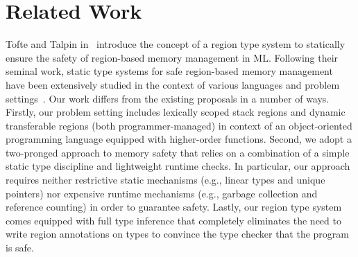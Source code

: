 \section{Related Work}
\label{sec:related-work}


Tofte and Talpin in~\cite{tofte93,tofte94,tofte97} introduce the
concept of a region type system to statically ensure the safety of
region-based memory management in ML. Following their seminal work,
static type systems for safe region-based memory management have been
extensively studied in the context of various languages and problem
settings~\cite{cyclone02, cyclone04, yates99, MIT03, DPJ09, HMN01,
WW01, rust, gpu14}. Our work differs from the existing proposals in a
number of ways. Firstly, our problem setting includes lexically scoped
stack regions and dynamic transferable regions (both
programmer-managed) in context of an object-oriented programming
language equipped with higher-order functions. Second, we adopt a
two-pronged approach to memory safety that relies on a combination of
a simple static type discipline and lightweight runtime checks. 
In particular, our approach requires neither restrictive static
mechanisms (e.g., linear types and unique pointers) nor expensive
runtime mechanisms (e.g., garbage collection and reference counting)
in order to guarantee safety. Lastly, our region type system comes
equipped with full type inference that completely eliminates the need
to write region annotations on types to convince the type checker that
the program is safe. 

